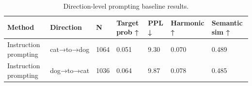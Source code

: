 \begin{table}[t]
\centering
\small
\begin{tabular}{lllllll}
\toprule
Method & Direction & N & Target prob ↑ & PPL ↓ & Harmonic ↑ & Semantic sim ↑ \\
\midrule
Instruction prompting & cat→to→dog & 1064 & 0.051 & 9.30 & 0.070 & 0.489 \\
Instruction prompting & dog→to→cat & 1036 & 0.064 & 9.87 & 0.078 & 0.485 \\
\bottomrule
\end{tabular}
\caption{Direction-level prompting baseline results.}
\label{tab:prompt-directions}
\end{table}
